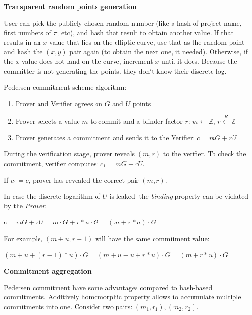 \documentclass[../lecture-notes.tex]{subfiles}
\begin{document}
\begin{remark}
    \textbf{Transparent random points generation}

    User can pick the publicly chosen random number (like a hash of project name, first numbers of $\pi$, etc), and hash that result to obtain another value. If that results in an $x$ value that lies on the elliptic curve, use that as the random point and hash the $(x, y)$ pair again (to obtain the next one, it needed). Otherwise, if the $x$-value does not land on the curve, increment $x$ until it does. Because the committer is not generating the points, they don`t know their discrete log. 
\end{remark}

Pedersen commitment scheme algorithm:
\begin{enumerate}
    \item Prover and Verifier agrees on $G$ and $U$ points
    \item Prover selects a value $m$ to commit and a blinder factor $r$:
            $m \leftarrow \mathbb{Z}$,
            $r \xleftarrow{R} \mathbb{Z}$
    \item Prover generates a commitment and sends it to the Verifier:
            $c = mG + rU$
\end{enumerate}

During the verification stage, prover reveals $(m, r)$ to the verifier. 
To check the commitment, verifier computes: $c_1 = mG + rU$.

If $c_1 = c$, prover has revealed the correct pair $(m, r)$.

\begin{remark}
    In case the discrete logarithm of $U$ is leaked, the \textit{binding} property can be violated by the \textit{Prover}:

    $c = mG + rU = m \cdot G + r*u \cdot G = (m + r*u) \cdot G$
    
    For example, $(m + u, r - 1)$ will have the same commitment value:

    $(m+u + (r-1)*u) \cdot G = (m + u - u + r*u) \cdot G = (m + r*u) \cdot G$ 
        
\end{remark}

\textbf{Commitment aggregation}

Pedersen commitment have some advantages compared to hash-based commitments.
Additively homomorphic property allows to accumulate multiple commitments into one.
Consider two pairs: $(m_1, r_1), (m_2, r_2)$.
\end{document}
